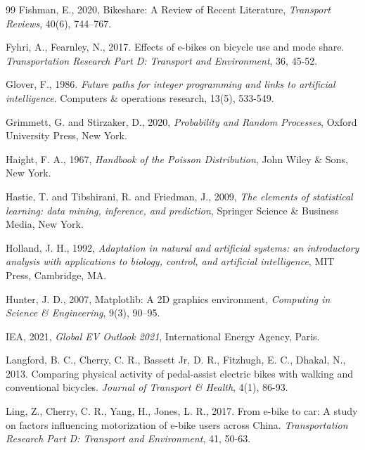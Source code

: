 \documentclass{skripsimathugm}
\begin{document}
\begin{thebibliography}{99}
Fishman, E., 2020, Bikeshare: A Review of Recent Literature, \emph{Transport Reviews}, 40(6), 744--767.

Fyhri, A., Fearnley, N., 2017. Effects of e-bikes on bicycle use and mode share. \emph{Transportation Research Part D: Transport and Environment}, 36, 45-52.

Glover, F., 1986. \emph{Future paths for integer programming and links to artificial intelligence}. Computers \& operations research, 13(5), 533-549.

Grimmett, G. and Stirzaker, D., 2020, \emph{Probability and Random Processes}, Oxford University Press, New York.

Haight, F. A., 1967, \emph{Handbook of the Poisson Distribution}, John Wiley \& Sons, New York.

Hastie, T. and Tibshirani, R. and Friedman, J., 2009, \emph{The elements of statistical learning: data mining, inference, and prediction}, Springer Science \& Business Media, New York.

Holland, J. H., 1992, \emph{Adaptation in natural and artificial systems: an introductory analysis with applications to biology, control, and artificial intelligence}, MIT Press, Cambridge, MA.

Hunter, J. D., 2007, Matplotlib: A 2D graphics environment, \emph{Computing in Science \& Engineering}, 9(3), 90--95.

IEA, 2021, \emph{Global EV Outlook 2021}, International Energy Agency, Paris.

Langford, B. C., Cherry, C. R., Bassett Jr, D. R., Fitzhugh, E. C., Dhakal, N., 2013. Comparing physical activity of pedal-assist electric bikes with walking and conventional bicycles. \emph{Journal of Transport \& Health}, 4(1), 86-93.

Ling, Z., Cherry, C. R., Yang, H., Jones, L. R., 2017. From e-bike to car: A study on factors influencing motorization of e-bike users across China. \emph{Transportation Research Part D: Transport and Environment}, 41, 50-63.


\end{thebibliography}
\end{document}
